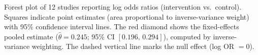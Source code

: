 \caption{Forest plot of 12 studies reporting log odds ratios (intervention vs.\ control).
Squares indicate point estimates (area proportional to inverse-variance weight) with 95\% confidence interval lines.
The red diamond shows the fixed-effects pooled estimate
($\hat{\theta} = 0.245$; 95\% CI $[0.196,\, 0.294]$),
computed by inverse-variance weighting.
The dashed vertical line marks the null effect (log OR $= 0$).}
